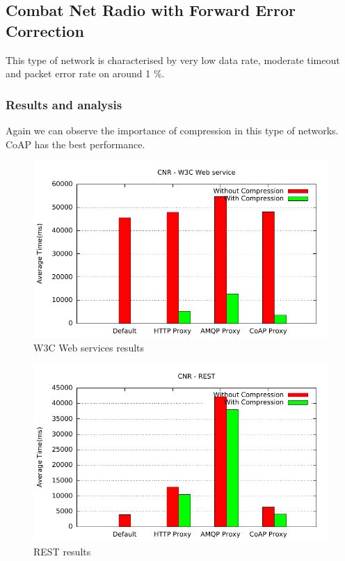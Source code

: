 \subsection{Combat Net Radio with Forward Error Correction}

This type of network is characterised by very low data rate, moderate timeout
and packet error rate on around 1 \%.


\subsubsection{Results and analysis}

Again we can observe the importance of compression in this type of networks.
CoAP has the best performance.

\begin{figure}[H]
\center
\includegraphics[scale=0.75]{../results/cnr/nffi/out.pdf}
\caption{W3C Web services results}
\end{figure}

\begin{figure}[H]
\center
\includegraphics[scale=0.75]{../results/cnr/rest/out.pdf}
\caption{REST results}
\end{figure}


